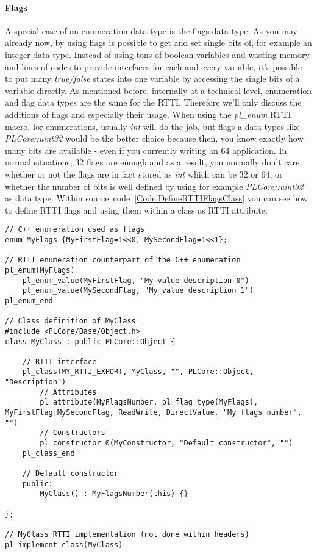 \paragraph{Flags}
A special case of an enumeration data type is the flags data type. As you may already now, by using flags is possible to get and set single bits of, for example an integer data type. Instead of using tons of boolean variables and wasting memory and lines of codes to provide interfaces for each and every variable, it's possible to put many \emph{true/false} states into one variable by accessing the single bits of a variable directly. As mentioned before, internally at a technical level, enumeration and flag data types are the same for the RTTI. Therefore we'll only discuss the additions of flags and especially their usage. When using the \emph{pl\_enum} RTTI macro, for enumerations, usually \emph{int} will do the job, but flags a data types like \emph{PLCore::uint32} would be the better choice because then, you know exactly how many bits are available - even if you currently writing an \SI{64}{\bit} application. In normal situations, 32 flags are enough and as a result, you normally don't care whether or not the flags are in fact stored as \emph{int} which can be \SI{32}{\bit} or \SI{64}{\bit}, or whether the number of bits is well defined by using for example \emph{PLCore::uint32} as data type. Within source~code~\ref{Code:DefineRTTIFlagsClass} you can see how to define RTTI flags and using them within a class as RTTI attribute.
\begin{lstlisting}[label=Code:DefineRTTIFlagsClass,caption={Defining new RTTI flags and a RTTI class using them}]
// C++ enumeration used as flags
enum MyFlags {MyFirstFlag=1<<0, MySecondFlag=1<<1};

// RTTI enumeration counterpart of the C++ enumeration
pl_enum(MyFlags)
	pl_enum_value(MyFirstFlag, "My value description 0")
	pl_enum_value(MySecondFlag, "My value description 1")
pl_enum_end

// Class definition of MyClass
#include <PLCore/Base/Object.h>
class MyClass : public PLCore::Object {

	// RTTI interface
	pl_class(MY_RTTI_EXPORT, MyClass, "", PLCore::Object, "Description")
		// Attributes
		pl_attribute(MyFlagsNumber, pl_flag_type(MyFlags), MyFirstFlag|MySecondFlag, ReadWrite, DirectValue, "My flags number", "")
		// Constructors
		pl_constructor_0(MyConstructor, "Default constructor", "")
	pl_class_end

	// Default constructor
	public:
		MyClass() : MyFlagsNumber(this) {}

};

// MyClass RTTI implementation (not done within headers)
pl_implement_class(MyClass)
\end{lstlisting}
